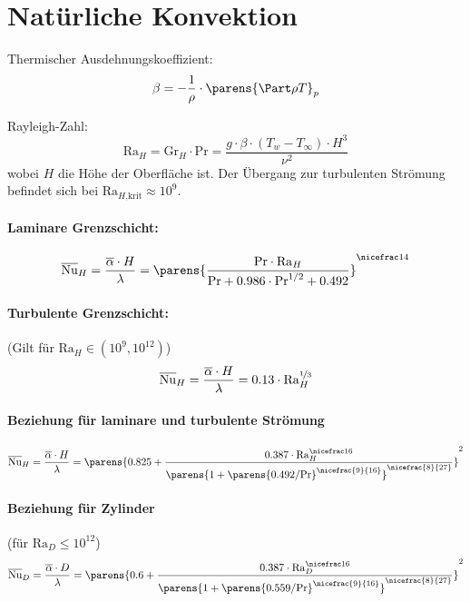 
\section{Natürliche Konvektion} %
	Thermischer Ausdehnungskoeffizient:
	\[
		\beta = - \frac 1 \rho \cdot \parens{ \Part \rho T }_p
	\]

	Rayleigh-Zahl:
	\[
		\mathrm{Ra}_H = \mathrm{Gr}_H \cdot \mathrm{Pr} = \frac{g \cdot \beta \cdot (T_w - T_\infty) \cdot H^3}{\nu^2}
	\]
	wobei $H$ die Höhe der Oberfläche ist. Der Übergang zur turbulenten Strömung befindet sich bei $\mathrm{Ra}_{H\text{,krit}} \approx 10^9$.

	\paragraph{Laminare Grenzschicht:} %
		\[
			\overline{\mathrm{Nu}}_H = \frac{\overline{\alpha} \cdot H}{\lambda} =
			\parens{\frac{\mathrm{Pr} \cdot \mathrm{Ra}_H}{\mathrm{Pr} + 0.986 \cdot \mathrm{Pr}^{1/2} + 0.492}}^{\nicefrac 1 4}
		\]

	\paragraph{Turbulente Grenzschicht:} %
		(Gilt für $\mathrm{Ra}_H \in (10^9,10^{12})$)
		\[
			\overline{\mathrm{Nu}}_H = \frac{\overline{\alpha} \cdot H}{\lambda} =
			0.13 \cdot \mathrm{Ra}_H^{\nicefrac 1 3}
		\]

	\paragraph{Beziehung für laminare und turbulente Strömung} %
		\[
			\overline{\mathrm{Nu}}_H = \frac{\overline{\alpha} \cdot H}{\lambda} = \parens{0.825 + \frac{0.387 \cdot \mathrm{Ra}_H^{\nicefrac 1 6}}{\parens{1 + \parens{0.492 / \mathrm{Pr}}^{\nicefrac{9}{16}}}^{\nicefrac{8}{27}}}}^2
		\]

	\paragraph{Beziehung für Zylinder} %
		(für $\mathrm{Ra}_D \leq 10^{12}$)
		\[
			\overline{\mathrm{Nu}}_D = \frac{\overline{\alpha} \cdot D}{\lambda} = \parens{0.6 + \frac{0.387 \cdot \mathrm{Ra}_D^{\nicefrac 1 6}}{\parens{1 + \parens{0.559 / \mathrm{Pr}}^{\nicefrac{9}{16}}}^{\nicefrac{8}{27}}}}^2
		\]

